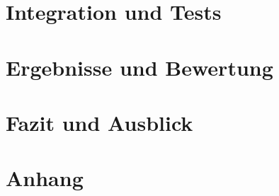 \documentclass[a4paper, 10pt]{article} %
\begin{document}
\section{Integration und Tests}
    

\section{Ergebnisse und Bewertung}


\section{Fazit und Ausblick}
    
\newpage

\section{Anhang}
    
\newpage

\printbibliography[heading=bibintoc, title={Literaturverzeichnis}, notcategory=ignore]
\listoffigures
\listoftables
\end{document}
